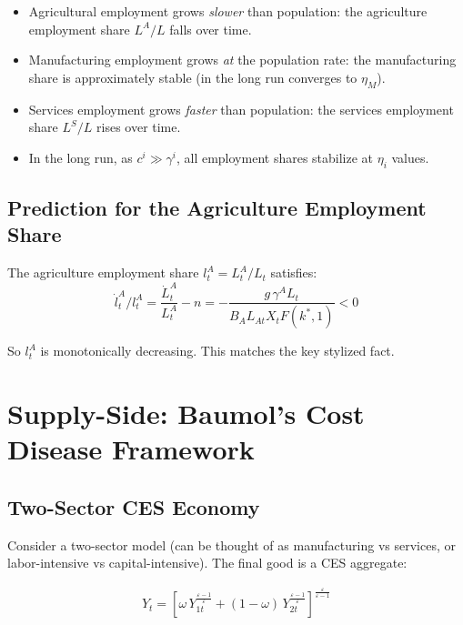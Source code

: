 \documentclass[a4paper,11pt]{article}
\begin{document}
\begin{itemize}
    \item Agricultural employment grows \emph{slower} than population: the agriculture employment share $L^A/L$ falls over time.
    \item Manufacturing employment grows \emph{at} the population rate: the manufacturing share is approximately stable (in the long run converges to $\eta_M$).
    \item Services employment grows \emph{faster} than population: the services employment share $L^S/L$ rises over time.
    \item In the long run, as $c^i \gg \gamma^i$, all employment shares stabilize at $\eta_i$ values.
\end{itemize}

\subsection*{Prediction for the Agriculture Employment Share}

The agriculture employment share $l^A_t = L^A_t/L_t$ satisfies:
\[
\dot{l}^A_t / l^A_t = \frac{\dot{L}^A_t}{L^A_t} - n = -\frac{g\, \gamma^A L_t}{B_A L_{At} X_t F(k^*,1)} < 0
\]

So $l^A_t$ is monotonically decreasing. This matches the key stylized fact.

\clearpage

\section{Supply-Side: Baumol's Cost Disease Framework}

\subsection*{Two-Sector CES Economy}

Consider a two-sector model (can be thought of as manufacturing vs services, or labor-intensive vs capital-intensive). The final good is a CES aggregate:

\begin{align*}
Y_t = \left[\omega\, Y_{1t}^{\frac{\varepsilon-1}{\varepsilon}} + (1-\omega)\, Y_{2t}^{\frac{\varepsilon-1}{\varepsilon}}\right]^{\frac{\varepsilon}{\varepsilon-1}}
\tag{CES Aggregator}
\end{align*}
\end{document}
